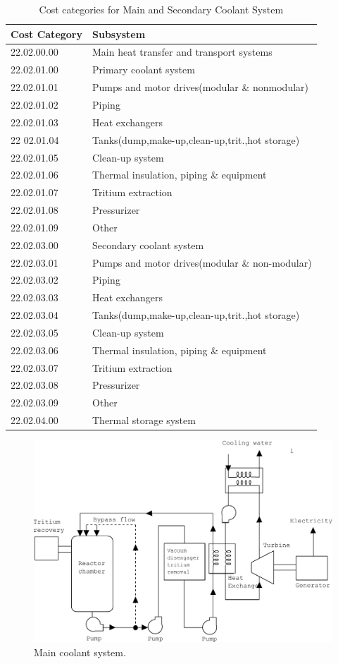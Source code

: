 \begin{table}[h!]   
     \centering   
     \begin{tabular}{l l  }   
     \hline
     Cost Category &   Subsystem				\\
      \hline
 22.02.00.00 &   Main heat transfer and transport systems				\\
 22.02.01.00 &     Primary coolant system				\\
 22.02.01.01 &       Pumps and  motor drives(modular \& nonmodular)				\\
 22.02.01.02 &       Piping				\\
 22.02.01.03 &       Heat exchangers				\\
 22 02.01.04 &       Tanks(dump,make-up,clean-up,trit.,hot storage)		\\		
 22.02.01.05 &       Clean-up system				\\
 22.02.01.06 &       Thermal insulation, piping \& equipment				\\
 22.02.01.07 &       Tritium extraction				\\
 22.02.01.08 &       Pressurizer				\\
 22.02.01.09 &       Other				\\
 22.02.03.00 &     Secondary coolant system				\\
 22.02.03.01 &       Pumps and motor drives(modular \& non-modular)			\\	
 22.02.03.02 &       Piping				\\
 22.02.03.03 &       Heat exchangers				\\
 22.02.03.04 &       Tanks(dump,make-up,clean-up,trit.,hot storage)			\\	
 22.02.03.05 &       Clean-up system				\\
 22.02.03.06 &       Thermal insulation, piping \& equipment				\\
 22.02.03.07 &       Tritium extraction				\\
 22.02.03.08 &       Pressurizer				\\
 22.02.03.09 &       Other				\\
 22.02.04.00 &     Thermal storage system  \\
 \hline
     \end{tabular}  
     \caption{Cost categories for Main and Secondary Coolant System }  
     \label{tab:222}  
 \end{table}   


\begin{figure}[h!]  
\centering  
\includegraphics[width=0.8\linewidth]{StandardFigures/steamPbLi-eps-converted-to.pdf}
\caption{Main coolant system.}
\label{fig:coola}
\end{figure} 
